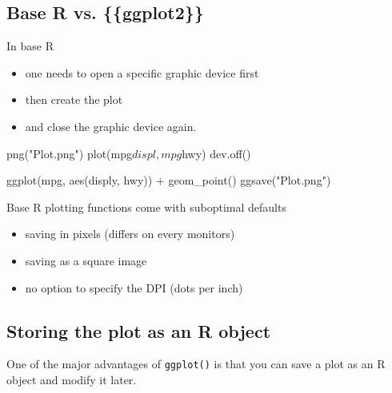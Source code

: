 \documentclass[]{book}
\newenvironment{Shaded}{}{}
\newcommand{\KeywordTok}[1]{\textcolor[rgb]{0.00,0.00,1.00}{#1}}
\newcommand{\NormalTok}[1]{#1}
\newcommand{\OperatorTok}[1]{#1}
\newcommand{\StringTok}[1]{\textcolor[rgb]{0.00,0.50,0.50}{#1}}
\begin{document}
\hypertarget{base-r-vs.-ggplot2}{%
\subsection{Base R vs. \{\{ggplot2\}\}}\label{base-r-vs.-ggplot2}}

In base R

\begin{itemize}
\item
  one needs to open a specific graphic device first
\item
  then create the plot
\item
  and close the graphic device again.
\end{itemize}

\begin{Shaded}
\begin{Highlighting}[]
\KeywordTok{png}\NormalTok{(}\StringTok{"Plot.png"}\NormalTok{)}
\KeywordTok{plot}\NormalTok{(mpg}\OperatorTok{$}\NormalTok{displ, mpg}\OperatorTok{$}\NormalTok{hwy)}
\KeywordTok{dev.off}\NormalTok{()}
\end{Highlighting}
\end{Shaded}

\begin{Shaded}
\begin{Highlighting}[]
\KeywordTok{ggplot}\NormalTok{(mpg, }\KeywordTok{aes}\NormalTok{(disply, hwy)) }\OperatorTok{+}
\StringTok{  }\KeywordTok{geom_point}\NormalTok{()}
\KeywordTok{ggsave}\NormalTok{(}\StringTok{"Plot.png"}\NormalTok{)}
\end{Highlighting}
\end{Shaded}

Base R plotting functions come with suboptimal defaults

\begin{itemize}
\item
  saving in pixels (differs on every monitors)
\item
  saving as a square image
\item
  no option to specify the DPI (dots per inch)
\end{itemize}

\hypertarget{storing-the-plot-as-an-r-object}{%
\subsection{Storing the plot as an R object}\label{storing-the-plot-as-an-r-object}}

One of the major advantages of \texttt{ggplot()} is that you can save a plot as an R object and modify it later.
\end{document}
